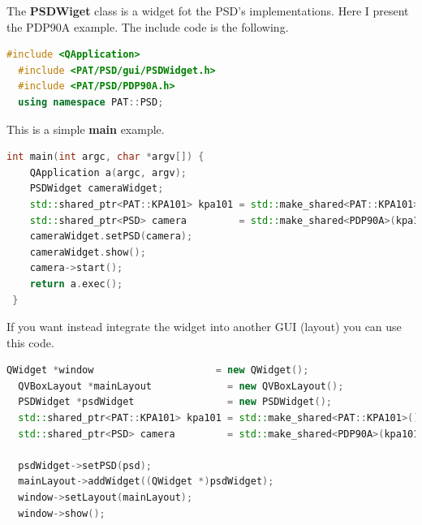 
The \textbf{PSDWiget} class is a widget fot the PSD's implementations.
Here I present the PDP90A example. The include code is the following.

\begin{lstlisting}[language=c++, gobble=2]
  #include <QApplication>
  #include <PAT/PSD/gui/PSDWidget.h>
  #include <PAT/PSD/PDP90A.h>
  using namespace PAT::PSD;
\end{lstlisting}

This is a simple \textbf{main} example.

\begin{lstlisting}[language=c++, gobble=2]
  int main(int argc, char *argv[]) {
    QApplication a(argc, argv);
    PSDWidget cameraWidget;
    std::shared_ptr<PAT::KPA101> kpa101 = std::make_shared<PAT::KPA101>();
    std::shared_ptr<PSD> camera         = std::make_shared<PDP90A>(kpa101);
    cameraWidget.setPSD(camera);
    cameraWidget.show();
    camera->start();
    return a.exec();
 }
\end{lstlisting}

If you want instead integrate the widget into another GUI (layout) you
can use this code.

\begin{lstlisting}[language=c++, gobble=2]
  QWidget *window                     = new QWidget();
  QVBoxLayout *mainLayout             = new QVBoxLayout();
  PSDWidget *psdWidget                = new PSDWidget();
  std::shared_ptr<PAT::KPA101> kpa101 = std::make_shared<PAT::KPA101>();
  std::shared_ptr<PSD> camera         = std::make_shared<PDP90A>(kpa101);
  
  psdWidget->setPSD(psd);
  mainLayout->addWidget((QWidget *)psdWidget);
  window->setLayout(mainLayout);
  window->show();
\end{lstlisting}


